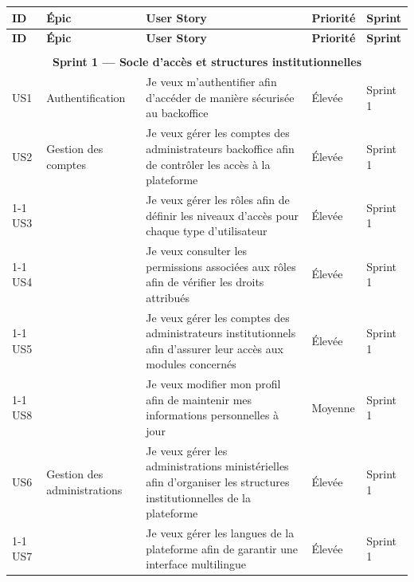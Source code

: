 \begin{longtable}{|p{0.8cm}|p{2.5cm}|p{6.2cm}|p{1.5cm}|p{1.5cm}|}
\hline
\rowcolor{orange!30}
\textbf{ID} & \textbf{Épic} & \textbf{User Story} & \textbf{Priorité} & \textbf{Sprint} \\ \hline
\endfirsthead

\hline
\rowcolor{orange!30}
\textbf{ID} & \textbf{Épic} & \textbf{User Story} & \textbf{Priorité} & \textbf{Sprint} \\ \hline
\endhead

\hline
\endfoot

\endlastfoot

\multicolumn{5}{|c|}{\cellcolor{orange!40}\textbf{Release 1 — Sprints 1, 2 et 3}} \\ \hline

\multicolumn{5}{|c|}{\cellcolor{orange!15}\textbf{Sprint 1 — Socle d'accès et 
structures institutionnelles}} \\ \hline

US1  & Authentification & Je veux m'authentifier afin d'accéder de manière sécurisée au backoffice & Élevée & Sprint 1 \\ \hline

US2  & Gestion des comptes
     & Je veux gérer les comptes des administrateurs backoffice afin de contrôler les accès à la plateforme & Élevée & Sprint 1 \\ \cline{1-1}\cline{3-5}
US3  & & Je veux gérer les rôles afin de définir les niveaux d'accès pour chaque type d'utilisateur & Élevée & Sprint 1 \\ \cline{1-1}\cline{3-5}
US4  & & Je veux consulter les permissions associées aux rôles afin de vérifier les droits attribués & Élevée & Sprint 1 \\ \cline{1-1}\cline{3-5}
US5  & & Je veux gérer les comptes des administrateurs institutionnels afin d'assurer leur accès aux modules concernés & Élevée & Sprint 1 \\ \cline{1-1}\cline{3-5}
US8  & & Je veux modifier mon profil afin de maintenir mes informations personnelles à jour & Moyenne & Sprint 1 \\ \hline

US6  & Gestion des administrations
     & Je veux gérer les administrations ministérielles afin d'organiser les structures institutionnelles de la plateforme & Élevée & Sprint 1 \\ \cline{1-1}\cline{3-5}
US7  & & Je veux gérer les langues de la plateforme afin de garantir une interface multilingue & Élevée & Sprint 1 \\ \hline


\end{longtable}
